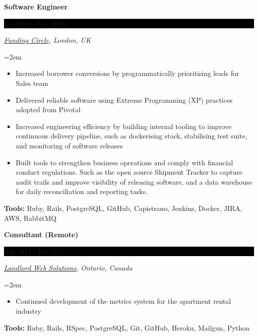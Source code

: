 \documentclass[paper=a4,fontsize=11pt]{scrartcl} %
\newcommand{\sepspace}{\vspace*{1em}}     %
\newcommand{\EducationEntry}[4]{
    \noindent \textbf{#1} \hfill        %
    \colorbox{Black}{
      \parbox{8.5em}{
      \hfill\color{White}#2}} \par      %
    \noindent \textit{#3} \par          %
    \noindent\hangindent=2em\hangafter=0 \small #4 %
    \normalsize \par}
\newcommand{\WorkEntry}[4]{             %
    \noindent \textbf{#1} \hfill        %
    \colorbox{Black}{%
      \parbox{9em}{%
      \hfill\color{White}#2}} \par      %
        \noindent \textit{#3} \par      %
    \noindent\hangindent=2em\hangafter=0 \small #4 %
    \normalsize \par}
\begin{document}
\WorkEntry{Software Engineer}{Feb 2015 - Oct 2016}
{\href{https://www.fundingcircle.com/}{Funding Circle}, London, UK}
{
 \begin{itemize} \itemsep -1pt
   \item Increased borrower conversions by programmatically prioritising leads for Sales team
   \item Delivered reliable software using Extreme Programming (XP) practices adopted from Pivotal %
   \item Increased engineering efficiency by building internal tooling to improve continuous delivery pipeline,
         such as dockerising stack, stabilising test suite, and monitoring of software releases
   \item Built tools to strengthen business operations and comply with financial conduct regulations.
         Such as the open source Shipment Tracker %
         to capture audit trails and improve visibility of releasing software,
         and a data warehouse for daily reconciliation and reporting tasks.
 \end{itemize}
 \textbf{Tools:} Ruby, Rails, PostgreSQL, GitHub, Capistrano, Jenkins, Docker, JIRA, AWS, RabbitMQ
}
\sepspace

\WorkEntry{Consultant (Remote)}{Sep 2014 - Feb 2015}
{\href{https://www.landlordwebsolutions.com/}{Landlord Web Solutions}, Ontario, Canada}
{
 \begin{itemize} \itemsep -1pt
   \item Continued development of the metrics system for the apartment rental industry
 \end{itemize}
 \textbf{Tools:} Ruby, Rails, RSpec, PostgreSQL, Git, GitHub, Heroku, Mailgun, Python
}
\sepspace
\end{document}
